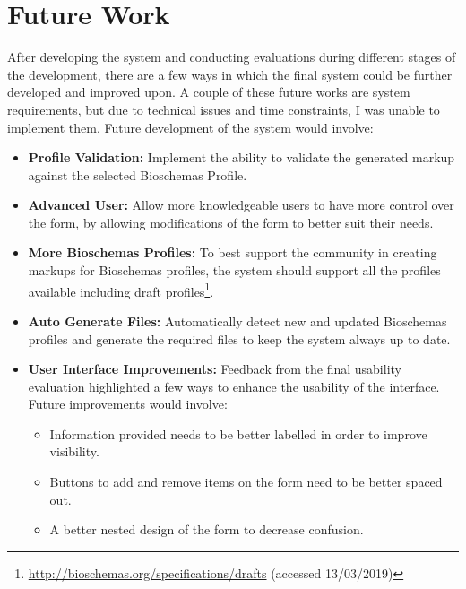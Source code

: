 {\section{Future Work}\label{sec:futurework}
After developing the system and conducting evaluations during different stages of the development, there are a few ways in which the final system could be further developed and improved upon. A couple of these future works are system requirements, but due to technical issues and time constraints, I was unable to implement them. Future development of the system would involve:
\begin{itemize}
    \item\textbf{Profile Validation:} Implement the ability to validate the generated markup against the selected Bioschemas Profile.
    \item \textbf{Advanced User:} Allow more knowledgeable users to have more control over the form, by allowing modifications of the form to better suit their needs.
    \item \textbf{More Bioschemas Profiles:} To best support the community in creating markups for Bioschemas profiles, the system should support all the profiles available including draft profiles\footnote{\url{http://bioschemas.org/specifications/drafts} (accessed 13/03/2019)}.
    \item \textbf{Auto Generate Files:} Automatically detect new and updated Bioschemas profiles and generate the required files to keep the system always up to date. 
    \item \textbf{User Interface Improvements:} Feedback from the final usability evaluation highlighted a few ways to enhance the usability of the interface. Future improvements would involve: 
    \begin{itemize}
        \item Information provided needs to be better labelled in order to improve visibility.
        \item Buttons to add and remove items on the form need to be better spaced out.
        \item A better nested design of the form to decrease confusion.
    \end{itemize}
    \end{itemize}
}